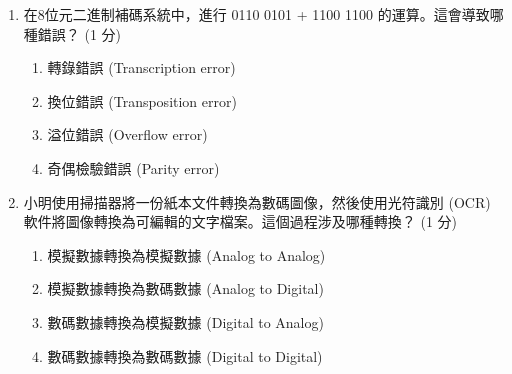 \documentclass[12pt,a4paper]{article}
\begin{document}
\begin{enumerate}
    \item 在8位元二進制補碼系統中，進行 0110 0101 + 1100 1100 的運算。這會導致哪種錯誤？ (1 分)
    \begin{enumerate}[label=\Alph*.]
        \item 轉錄錯誤 (Transcription error)
        \item 換位錯誤 (Transposition error)
        \item 溢位錯誤 (Overflow error)
        \item 奇偶檢驗錯誤 (Parity error)
    \end{enumerate}
    
    \item 小明使用掃描器將一份紙本文件轉換為數碼圖像，然後使用光符識別 (OCR) 軟件將圖像轉換為可編輯的文字檔案。這個過程涉及哪種轉換？ (1 分)
    \begin{enumerate}[label=\Alph*.]
        \item 模擬數據轉換為模擬數據 (Analog to Analog)
        \item 模擬數據轉換為數碼數據 (Analog to Digital)
        \item 數碼數據轉換為模擬數據 (Digital to Analog)
        \item 數碼數據轉換為數碼數據 (Digital to Digital)
    \end{enumerate}
    
\end{enumerate}

\newpage
\end{document}
